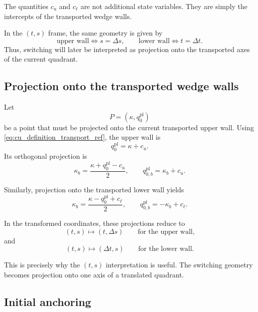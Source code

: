 \documentclass[11pt,a4paper]{article}
\begin{document}
The quantities \(c_u\) and \(c_\ell\) are not additional state variables. They are simply the intercepts of the transported wedge walls.

In the \((t,s)\) frame, the same geometry is given by
\begin{equation}
\text{upper wall} \iff s=\Delta s,
\qquad
\text{lower wall} \iff t=\Delta t.
\label{eq:transported_axes_ts_transport_ref}
\end{equation}
Thus, switching will later be interpreted as projection onto the transported axes of the current quadrant.

\subsection{Projection onto the transported wedge walls}

Let
\[
P=(\kappa,q^{\mathrm{pl}}_0)
\]
be a point that must be projected onto the current transported upper wall. Using \eqref{eq:cu_definition_transport_ref}, the upper wall is
\[
q^{\mathrm{pl}}_0=\kappa+c_u.
\]
Its orthogonal projection is
\begin{equation}
\kappa_b
=
\frac{\kappa + q^{\mathrm{pl}}_0 - c_u}{2},
\qquad
q^{\mathrm{pl}}_{0,b}
=
\kappa_b + c_u.
\label{eq:projection_upper_transport_ref}
\end{equation}

Similarly, projection onto the transported lower wall yields
\begin{equation}
\kappa_b
=
\frac{\kappa - q^{\mathrm{pl}}_0 + c_\ell}{2},
\qquad
q^{\mathrm{pl}}_{0,b}
=
-\kappa_b + c_\ell.
\label{eq:projection_lower_transport_ref}
\end{equation}

In the transformed coordinates, these projections reduce to
\begin{equation}
(t,s)\mapsto (t,\Delta s)
\qquad
\text{for the upper wall,}
\label{eq:projection_upper_ts_transport_ref}
\end{equation}
and
\begin{equation}
(t,s)\mapsto (\Delta t,s)
\qquad
\text{for the lower wall.}
\label{eq:projection_lower_ts_transport_ref}
\end{equation}

This is precisely why the \((t,s)\) interpretation is useful. The switching geometry becomes projection onto one axis of a translated quadrant.

\subsection{Initial anchoring}
\end{document}
